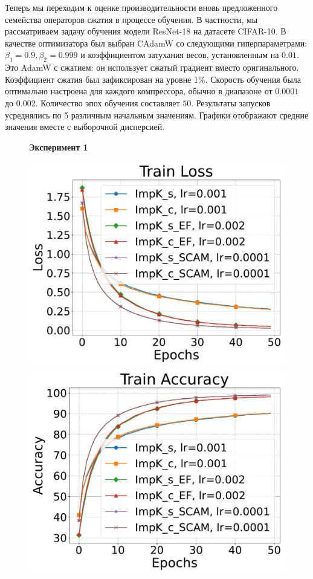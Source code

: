     Теперь мы переходим к оценке производительности вновь предложенного семейства операторов сжатия в процессе обучения. В частности, мы рассматриваем задачу обучения модели ResNet-18 на датасете CIFAR-10. В качестве оптимизатора был выбран CAdamW со следующими гиперпараметрами: $\beta_1 = 0.9, \beta_2 = 0.999$ и коэффициентом затухания весов, установленным на $0.01$. Это AdamW с сжатием: он использует сжатый градиент вместо оригинального. Коэффициент сжатия был зафиксирован на уровне 1\%. Скорость обучения была оптимально настроена для каждого компрессора, обычно в диапазоне от $0.0001$ до $0.002$. Количество эпох обучения составляет $50$. Результаты запусков усреднялись по 5 различным начальным значениям. Графики отображают средние значения вместе с выборочной дисперсией.
    \begin{figure}[ht]
        \centering
            \textbf{Эксперимент 1}\par\medskip
            \begin{minipage}{0.45\textwidth}
                \includegraphics[width=\textwidth]{figures/resnet/experiment1/Train Loss.pdf}
            \end{minipage}
            \begin{minipage}{0.45\textwidth}
                \includegraphics[width=\textwidth]{figures/resnet/experiment1/Train Accuracy.pdf}

\end{minipage}
\end{figure}
